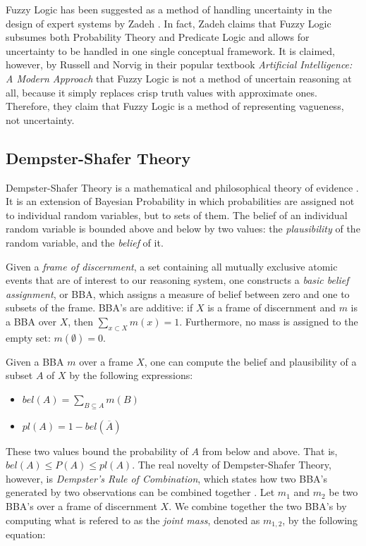 \documentclass[thesis.tex]{subfiles}
\begin{document}
Fuzzy Logic has been suggested as a method of handling uncertainty in the design
of expert systems by Zadeh \cite{zadeh1983role}. In fact, Zadeh claims that
Fuzzy Logic subsumes both Probability Theory and Predicate Logic and allows for
uncertainty to be handled in one single conceptual framework. It is claimed, however,
by Russell and Norvig in their popular textbook \emph{Artificial Intelligence: A Modern Approach}
\cite{russell2003} that Fuzzy Logic is not a method of uncertain reasoning at all,
because it simply replaces crisp truth values with approximate ones. Therefore, they
claim that Fuzzy Logic is a method of representing vagueness, not uncertainty.



\subsection{Dempster-Shafer Theory}
\label{sec:dst}

Dempster-Shafer Theory is a mathematical and philosophical theory of evidence
\cite{shafer1976mathematical}. It is an extension of Bayesian Probability in which
probabilities are assigned not to individual random variables, but to sets of them.
The belief of an individual random variable is bounded above and below by two values:
the \emph{plausibility} of the random variable, and the \emph{belief} of it.

Given a \emph{frame of discernment}, a set containing all mutually exclusive atomic
events that are of interest to our reasoning system, one constructs a \emph{basic belief assignment},
or BBA, which assigns a measure of belief between zero and one to subsets of the frame. BBA's are additive: if
$X$ is a frame of discernment and $m$ is a BBA over $X$, then $\sum_{x \subset X} m(x) = 1$.
Furthermore, no mass is assigned to the empty set: $m(\emptyset) = 0$.

Given a BBA $m$ over a frame $X$, one can compute the belief and plausibility of a subset
$A$ of $X$ by the following expressions:

\begin{itemize}
  \item $bel(A) = \sum_{B \subseteq A} m(B)$
  \item $pl(A) = 1 - bel(\overline{A})$
\end{itemize}

These two values bound the probability of $A$ from below and above. That is,
$bel(A) \leq P(A) \leq pl(A)$. The real novelty of Dempster-Shafer Theory, however, is
\emph{Dempster's Rule of Combination}, which states how two BBA's generated
by two observations can be combined together \cite{dempster1968generalization}. Let $m_1$ and $m_2$ be two BBA's over a
frame of discernment $X$. We combine together the two BBA's by computing what is refered to
as the \emph{joint mass}, denoted as $m_{1,2}$, by the following equation:
\end{document}
